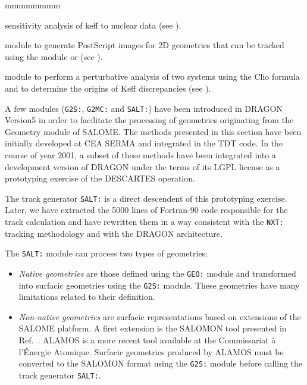 \begin{ListeDeDescription}{mmmmmmmm}
\item[\moc{SENS:}] sensitivity analysis of keff to nuclear data (see ).

\item[\moc{PSP:}] module to generate PostScript images for 2D geometries that can be tracked using the module 
 or  (see ).

\item[\moc{DUO:}] module to perform a perturbative analysis of two systems using the Clio formula and to determine the origins
of Keff discrepancies (see ).
\end{ListeDeDescription}

A few modules ({\tt G2S:}, {\tt G2MC:} and {\tt SALT:}) have been introduced in DRAGON Version5 in
order to facilitate the
processing of geometries originating from the Geometry module of SALOME.\cite{salome}
The methods presented in this section have been initially developed at CEA SERMA and
integrated in the TDT code.\cite{tdt,lyioussi} In the course of year 2001, a subset of
these methods have been integrated into a development version of DRAGON under the terms
of its LGPL license as a prototyping exercise of the DESCARTES operation.\cite{salt}

\vskip 0.08cm

The track generator {\tt SALT:} is a direct descendent of this prototyping exercise.
Later, we have extracted the 5000 lines of Fortran-90 code responsible for the track
calculation and have rewritten them in a way consistent with the {\tt NXT:} tracking
methodology and with the DRAGON architecture.

\vskip 0.08cm

The {\tt SALT:} module can process two types of geometries:
\begin{itemize}
\item {\sl Native geometries} are those defined using the {\tt GEO:} module and transformed into surfacic
geometries using the {\tt G2S:} module. These geometries have many limitations related to their
definition.
\item {\sl Non-native geometries} are surfacic representations based on extensions of the SALOME platform.
A first extension is the SALOMON tool presented in Ref.~. ALAMOS is a more recent tool
available at the Commissariat \`a l'\'Energie Atomique.\cite{alamos} Surfacic geometries produced by
ALAMOS must be converted to the SALOMON format using the {\tt G2S:} module before calling the track
generator {\tt SALT:}.
\end{itemize}
